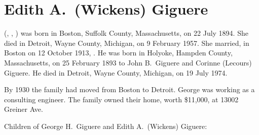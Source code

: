 \section{Edith A.\ (Wickens) Giguere}\label{per:Edith4Wickens}

 (, , ) was born in Boston, Suffolk County, Massachusetts, on 22 July 1894.\cite{Edith4WickensBirth} She died in Detroit, Wayne County, Michigan, on 9 February 1957.\cite{Edith4WickensDeath} She married, in Boston on 12 October 1913, .\cite{Edith4WickensMarriage} He was born in Holyoke, Hampden County, Massachusetts, on 25 February 1893 to John B.\ Giguere and Corinne (Lecours) Giguere.\cite{GeorgeGiguereBirth} He died in Detroit, Wayne County, Michigan, on 19 July 1974.\cite{GeorgeGiguereDeath}

By 1930 the family had moved from Boston to Detroit. George was working as a consulting engineer. The family owned their home, worth \$11,000, at 13002 Greiner Ave.\cite{Census1930GeorgeGiguere}

\begin{KidsIntro}
	Children of George H.\ Giguere and Edith A.\ (Wickens) Giguere:
\end{KidsIntro}

